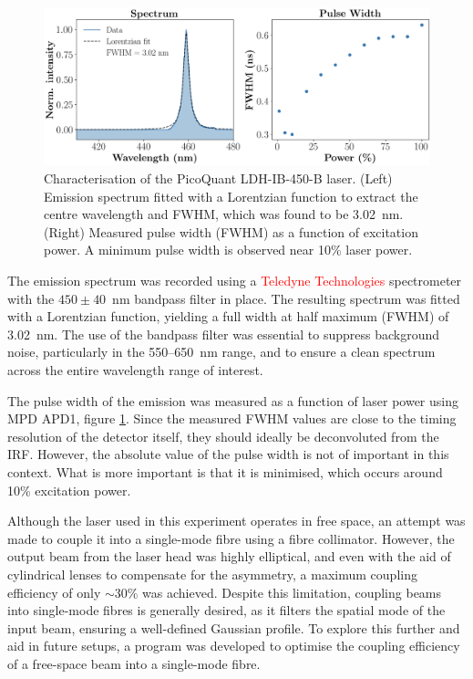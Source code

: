 \begin{figure}[h]
    \centering
    \includegraphics[width=0.9\linewidth]{Figures/LaserCharacterisation.png}
    \caption{Characterisation of the PicoQuant LDH-IB-450-B laser. (Left) Emission spectrum fitted with a Lorentzian function to extract the centre wavelength and FWHM, which was found to be 3.02~nm. (Right) Measured pulse width (FWHM) as a function of excitation power. A minimum pulse width is observed near 10\% laser power.}
    \label{fig:laser-char}
\end{figure}

The emission spectrum was recorded using a \textcolor{red}{Teledyne Technologies} spectrometer with the $450 \pm 40$~nm bandpass filter in place. The resulting spectrum was fitted with a Lorentzian function, yielding a full width at half maximum (FWHM) of 3.02~nm. The use of the bandpass filter was essential to suppress background noise, particularly in the 550--650~nm range, and to ensure a clean spectrum across the entire wavelength range of interest.

The pulse width of the emission was measured as a function of laser power using MPD APD1, figure \ref{fig:laser-char}. Since the measured FWHM values are close to the timing resolution of the detector itself, they should ideally be deconvoluted from the IRF. However, the absolute value of the pulse width is not of important in this context. What is more important is that it is minimised, which occurs around 10\% excitation power.

Although the laser used in this experiment operates in free space, an attempt was made to couple it into a single-mode fibre using a fibre collimator. However, the output beam from the laser head was highly elliptical, and even with the aid of cylindrical lenses to compensate for the asymmetry, a maximum coupling efficiency of only $\sim$30\% was achieved. Despite this limitation, coupling beams into single-mode fibres is generally desired, as it filters the spatial mode of the input beam, ensuring a well-defined Gaussian profile. To explore this further and aid in future setups, a program was developed to optimise the coupling efficiency of a free-space beam into a single-mode fibre.


